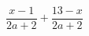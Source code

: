 \begin{ex}
	\begin{condition}
		\( \dfrac{x-1}{2a+2}+\dfrac{13-x}{2a+2} \)
	\end{condition}
\end{ex}